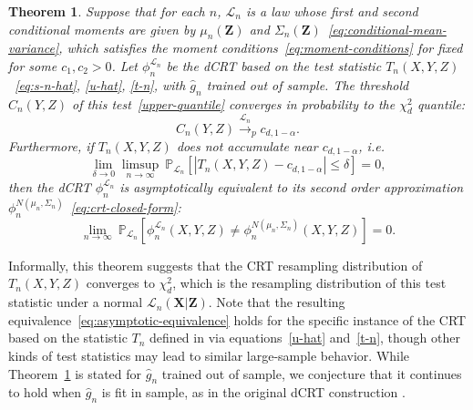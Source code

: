 \documentclass[12pt]{article}
\newtheorem{theorem}{Theorem}
\theoremstyle{definition}
\theoremstyle{remark}
\newcommand{\prx}{\bm X}
\newcommand{\srx}{X}
\newcommand{\prz}{\bm Z}
\newcommand{\srz}{Z}
\newcommand{\sry}{Y}
\begin{document}
\begin{theorem} \label{thm:equivalence}
Suppose that for each $n$, $\mathcal L_n$ is a law whose first and second conditional moments are given by $\mu_n(\prz)$ and $\Sigma_n(\prz)$~\eqref{eq:conditional-mean-variance}, which satisfies the moment conditions~\eqref{eq:moment-conditions} for fixed for some $c_1, c_2 > 0$. Let $\phi_n^{\mathcal L_n}$ be the dCRT based on the test statistic $T_n(\srx, \sry, \srz)$~\eqref{eq:s-n-hat}, \eqref{u-hat}, \eqref{t-n}, with $\widehat g_n$ trained out of sample. The threshold $C_n(\sry, \srz)$ of this test~\eqref{upper-quantile} converges in probability to the $\chi^2_d$ quantile:
	\begin{equation}
		C_n(Y,Z) \overset{\mathcal L_n}\rightarrow_p c_{d,1-\alpha}.
		\label{eq:threshold-convergence}
	\end{equation}
	Furthermore, if $T_n(\srx, \sry, \srz)$ does not accumulate near $c_{d,1-\alpha}$, i.e.
	\begin{equation}
		\lim_{\delta \rightarrow 0}\limsup_{n \rightarrow \infty}\ \mathbb P_{\mathcal L_n}[|T_n(\srx, \sry, \srz)-c_{d,1-\alpha}| \leq \delta] = 0,
		\label{eq:non-accumulation}
	\end{equation}
	then the dCRT $\phi_n^{\mathcal L_n}$ is asymptotically equivalent to its second order approximation $\phi^{N(\mu_n, \Sigma_n)}_n$~\eqref{eq:crt-closed-form}:
	\begin{equation}
		\lim_{n \rightarrow \infty}\ \mathbb P_{\mathcal L_n}[\phi^{\mathcal L_n}_n(\srx, \sry, \srz) \neq \phi^{N(\mu_n, \Sigma_n)}_n(\srx, \sry, \srz)] = 0.
		\label{eq:asymptotic-equivalence}
	\end{equation}	
\end{theorem}

Informally, this theorem suggests that the CRT resampling distribution of $T_n(\srx, \sry, \srz)$ converges to $\chi^2_d$, which is the resampling distribution of this test statistic under a normal $\mathcal L_n(\prx|\prz)$. Note that the resulting equivalence~\eqref{eq:asymptotic-equivalence} holds for the specific instance of the CRT based on the statistic $T_n$ defined in via equations~\eqref{u-hat} and~\eqref{t-n}, though other kinds of test statistics may lead to similar large-sample behavior. While Theorem~\ref{thm:equivalence} is stated for $\widehat g_n$ trained out of sample, we conjecture that it continues to hold when $\widehat g_n$ is fit in sample, as in the original dCRT construction \cite{Liu2020}. 
\end{document}
